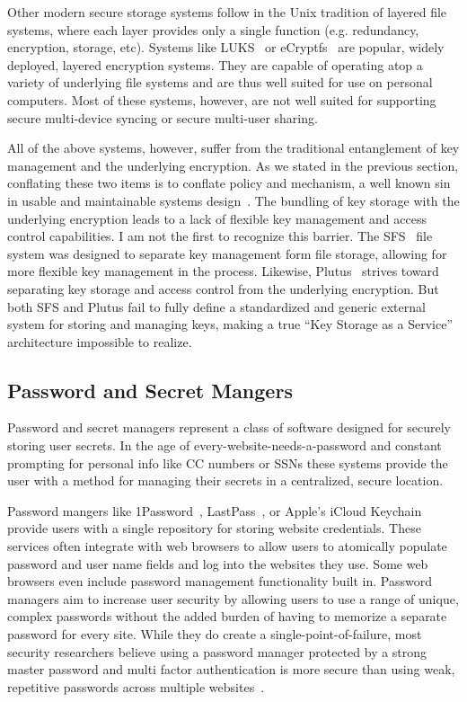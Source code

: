 Other modern secure storage systems follow in the Unix tradition of
layered file systems, where each layer provides only a single function
(e.g. redundancy, encryption, storage, etc). Systems like
LUKS~\cite{luks} or eCryptfs~\cite{eCryptfs, Halcrow} are popular,
widely deployed, layered encryption systems. They are capable of
operating atop a variety of underlying file systems and are thus well
suited for use on personal computers. Most of these systems, however,
are not well suited for supporting secure multi-device syncing or
secure multi-user sharing.

All of the above systems, however, suffer from the traditional
entanglement of key management and the underlying encryption. As we
stated in the previous section, conflating these two items is to
conflate policy and mechanism, a well known sin in usable and
maintainable systems design~\cite{Wulf1974}. The bundling of key
storage with the underlying encryption leads to a lack of flexible key
management and access control capabilities. I am not the first to
recognize this barrier. The SFS~\cite{Mazieres1999} file system was
designed to separate key management form file storage, allowing for
more flexible key management in the process. Likewise,
Plutus~\cite{Kallahalla2003} strives toward separating key storage and
access control from the underlying encryption. But both SFS and Plutus
fail to fully define a standardized and generic external system for
storing and managing keys, making a true ``Key Storage as a Service''
architecture impossible to realize.

\subsection{Password and Secret Mangers}

Password and secret managers represent a class of software designed
for securely storing user secrets. In the age of
every-website-needs-a-password and constant prompting for personal
info like CC numbers or SSNs these systems provide the user with a
method for managing their secrets in a centralized, secure location.

Password mangers like 1Password~\cite{onepassword},
LastPass~\cite{lastpass}, or Apple's iCloud Keychain~\cite{icloud}
provide users with a single repository for storing website
credentials. These services often integrate with web browsers to allow
users to atomically populate password and user name fields and log
into the websites they use. Some web browsers even include password
management functionality built in. Password managers aim to increase
user security by allowing users to use a range of unique, complex
passwords without the added burden of having to memorize a separate
password for every site. While they do create a
single-point-of-failure, most security researchers believe using a
password manager protected by a strong master password and multi
factor authentication is more secure than using weak, repetitive
passwords across multiple websites~\cite{schneier-passwords,
  krebs-passwords, brodkin-passman}.

